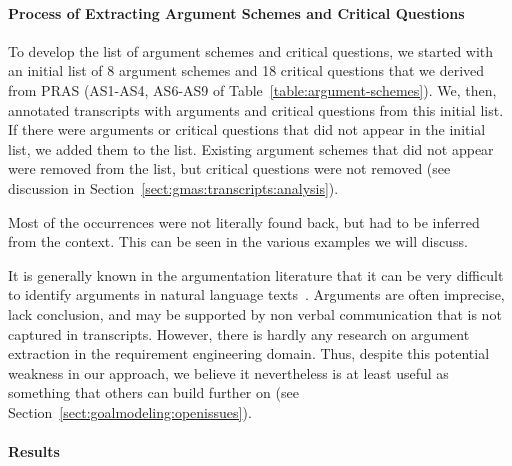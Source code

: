 \paragraph{Process of Extracting Argument Schemes and Critical Questions} %

To develop the list of argument schemes and critical questions, we started with an initial list of 8 argument schemes and 18 critical questions that we derived from PRAS (AS1-AS4, AS6-AS9 of Table~\ref{table:argument-schemes}). We, then, annotated transcripts with arguments and critical questions from this initial list. If there were arguments or critical questions that did not appear in the initial list, we added them to the list.
Existing argument schemes that did not appear were removed from the list, but critical questions were not removed (see discussion in Section~\ref{sect:gmas:transcripts:analysis}). %

Most of the occurrences were not literally found back, but had to be inferred from the context. This can be seen in the various examples we will discuss.

It is generally known in the argumentation literature that it can be very difficult to identify arguments in natural language texts~\cite{walton-etal2004}. Arguments are often imprecise, lack conclusion, and may be supported by non verbal communication that is not captured in transcripts. However, there is hardly any research on argument extraction in the requirement engineering domain. Thus, despite this potential weakness in our approach, we believe it nevertheless is at least useful as something that others can build further on (see Section~\ref{sect:goalmodeling:openissues}). %

\paragraph{Results}

